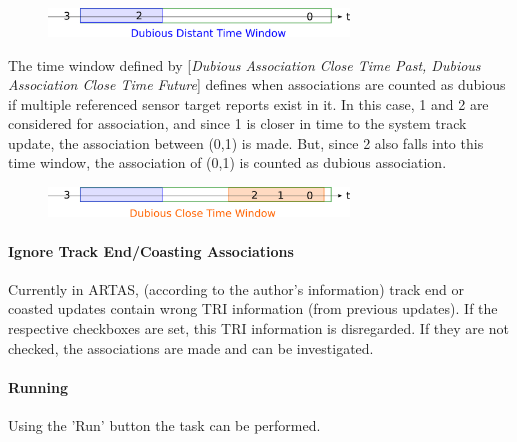 \begin{figure}[H]
  \center
    \includegraphics[width=8cm]{figures/artas_assoc_dubious_distant_window.png}
\end{figure}


The time window defined by [\textit{Dubious Association Close Time Past, Dubious Association Close Time Future}] defines when associations are counted as dubious if multiple referenced sensor target reports exist in it. In this case, 1 and 2 are considered for association, and since 1 is closer in time to the system track update, the association between (0,1) is made. But, since 2 also falls into this time window, the association of (0,1) is counted as dubious association.

\begin{figure}[H]
  \center
    \includegraphics[width=8cm]{figures/artas_assoc_dubious_close_window.png}
\end{figure}


\paragraph{Ignore Track End/Coasting Associations}

Currently in ARTAS, (according to the author's information) track end or coasted updates contain wrong TRI information (from previous updates). If the respective checkboxes are set, this TRI information is disregarded. If they are not checked, the associations are made and can be investigated.

\paragraph{Running}

Using the 'Run' button the task can be performed.

